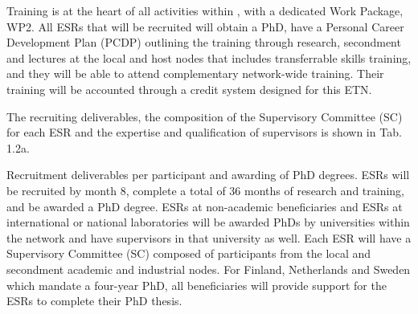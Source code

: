 Training is at the heart of all activities within \acronym, with a dedicated Work Package, WP2. All ESRs that will be recruited will obtain a PhD, have a Personal Career Development Plan (PCDP) outlining the training through research, secondment and lectures at the local and host nodes that includes transferrable skills training, and they will be able to attend complementary network-wide training. Their training will be accounted through a credit system designed for this ETN. 

The recruiting deliverables, the composition of the Supervisory Committee (SC) for each ESR and the expertise and qualification of supervisors is shown in Tab. 1.2a.



\noindent \color{blue}Recruitment deliverables per participant and awarding of PhD degrees. \color{black}
ESRs will be recruited by month 8, complete a total of 36 months of research and training, and be awarded a PhD degree. 
ESRs at non-academic beneficiaries and ESRs at international or national laboratories will be awarded PhDs by universities within the network and have supervisors in that university as well. 
Each ESR will have a Supervisory Committee (SC) composed of participants from the local and secondment academic and industrial nodes. 
For Finland, Netherlands and Sweden which mandate a four-year PhD, all beneficiaries will provide support for the ESRs to complete their PhD thesis.

